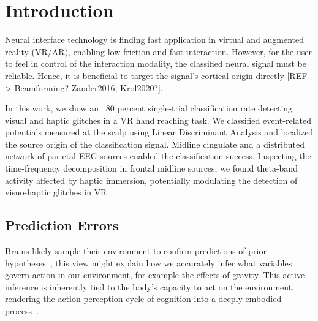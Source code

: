 \section{Introduction} 
Neural interface technology is finding fast application in virtual and augmented reality (VR/AR), enabling low-friction and fast interaction. However, for the user to feel in control of the interaction modality, the classified neural signal must be reliable. Hence, it is beneficial to target the signal's cortical origin directly [REF -> Beamforming? Zander2016, Krol2020?].

In this work, we show an ~80 percent single-trial classification rate detecting visual and haptic glitches in a VR hand reaching task. We classified event-related potentials measured at the scalp using Linear Discriminant Analysis and localized the source origin of the classification signal. Midline cingulate and a distributed network of parietal EEG sources enabled the classification success. Inspecting the time-frequency decomposition in frontal midline sources, we found theta-band activity affected by haptic immersion, potentially modulating the detection of visuo-haptic glitches in VR.

\subsection{Prediction Errors} %





Brains likely sample their environment to confirm predictions of prior hypotheses~\cites{Clark2013, Friston2010, Rao1999}; this view might explain how we accurately infer what variables govern action in our environment, for example the effects of gravity. This active inference is inherently tied to the body's capacity to act on the environment, rendering the action-perception cycle of cognition into a deeply embodied process~\cite{Friston2012}. 

